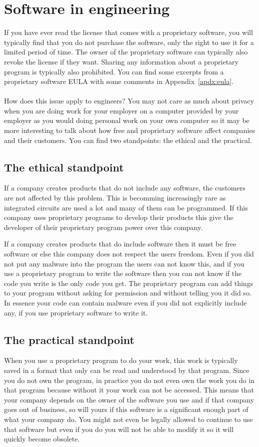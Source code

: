 \documentclass[12pt,a4paper]{article}
\begin{document}
\section{Software in engineering}
If you have ever read the license that comes with a proprietary software, you will typically find that you do not purchase the software, only the right to use it for a limited period of time. The owner of the proprietary software can typically also revoke the license if they want. Sharing any information about a proprietary program is typically also prohibited. You can find some excerpts from a proprietary software EULA with some comments in Appendix~\ref{apdx:eula}.
\\\\
How does this issue apply to engineers? You may not care as much about privacy when you are doing work for your employer on a computer provided by your employer as you would doing personal work on your own computer so it may be more interesting to talk about how free and proprietary software affect companies and their customers. You can find two standpoints: the ethical and the practical.

\subsection{The ethical standpoint}
If a company creates products that do not include any software, the customers are not affected by this problem. This is becomming increasingly rare as integrated circuits are used a lot and many of them can be programmed. If this company uses proprietary programs to develop their products this give the developer of their proprietary program power over this company.

If a company creates products that do include software then it must be free software or else this company does not respect the users freedom. Even if you did not put any malware into the program the users can not know this, and if you use a proprietary program to write the software then you can not know if the code you write is the only code you get. The proprietary program can add things to your program without asking for permission and without telling you it did so. In essence your code can contain malware even if you did not explicitly include any, if you use proprietary software to write it.

\subsection{The practical standpoint}
When you use a proprietary program to do your work, this work is typically saved in a format that only can be read and understood by that program. Since you do not own the program, in practice you do not even own the work you do in that program because without it your work can not be accessed. This means that your company depends on the owner of the software you use and if that company goes out of business, so will yours if this software is a significant enough part of what your company do. You might not even be legally allowed to continue to use that software but even if you do you will not be able to modify it so it will quickly become obsolete.
\end{document}
